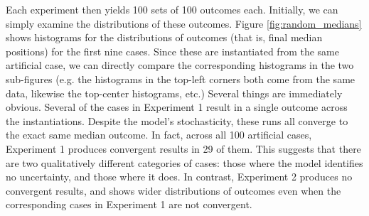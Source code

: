 Each experiment then yields 100 sets of 100 outcomes each. Initially, we can simply examine the distributions of these outcomes. Figure \ref{fig:random_medians} shows histograms for the distributions of outcomes (that is, final median positions) for the first nine cases. Since these are instantiated from the same artificial case, we can directly compare the corresponding histograms in the two sub-figures (e.g. the histograms in the top-left corners both come from the same data, likewise the top-center histograms, etc.) Several things are immediately obvious. Several of the cases in Experiment 1 result in a single outcome across the instantiations. Despite the model's stochasticity, these runs all converge to the exact same median outcome. In fact, across all 100 artificial cases, Experiment 1 produces convergent results in 29 of them. This suggests that there are two qualitatively different categories of cases: those where the model identifies no uncertainty, and those where it does. In contrast, Experiment 2 produces no convergent results, and shows wider distributions of outcomes even when the corresponding cases in Experiment 1 are not convergent.

